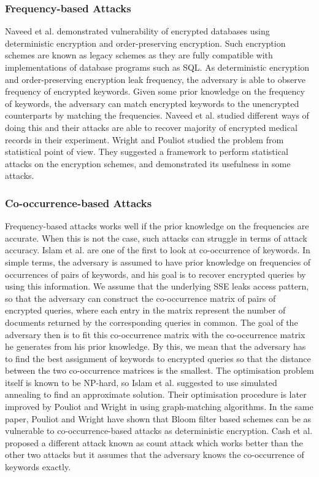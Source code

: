 \subsubsection{Frequency-based Attacks}
Naveed et al. \cite{CCS:NavKamWri15} demonstrated vulnerability of encrypted databases using deterministic encryption and order-preserving encryption. Such encryption schemes are known as legacy schemes as they are fully compatible with implementations of database programs such as SQL. As deterministic encryption and order-preserving encryption leak frequency, the adversary is able to observe frequency of encrypted keywords. Given some prior knowledge on the frequency of keywords, the adversary can match encrypted keywords to the unencrypted counterparts by matching the frequencies. Naveed et al. studied different ways of doing this and their attacks are able to recover majority of encrypted medical records in their experiment. Wright and Pouliot \cite{EPRINT:WriPou17} studied the problem from statistical point of view. They suggested a framework to perform statistical attacks on the encryption schemes, and demonstrated its usefulness in some attacks.




\subsubsection{Co-occurrence-based Attacks}
Frequency-based attacks works well if the prior knowledge on the frequencies are accurate. When this is not the case, such attacks can struggle in terms of attack accuracy. Islam et al. \cite{NDSS:IslKuzKan12} are one of the first to look at co-occurrence of keywords. In simple terms, the adversary is assumed to have prior knowledge on frequencies of occurrences of pairs of keywords, and his goal is to recover encrypted queries by using this information. We assume that the underlying SSE leaks access pattern, so that the adversary can construct the co-occurrence matrix of pairs of encrypted queries, where each entry in the matrix represent the number of documents returned by the corresponding queries in common. The goal of the adversary then is to fit this co-occurrence matrix with the co-occurrence matrix he generates from his prior knowledge. By this, we mean that the adversary has to find the best assignment of keywords to encrypted queries so that the distance between the two co-occurrence matrices is the smallest. The optimisation problem itself is known to be NP-hard, so Islam et al. suggested to use simulated annealing to find an approximate solution. Their optimisation procedure is later improved by Pouliot and Wright in \cite{CCS:PouWri16} using graph-matching algorithms. In the same paper, Pouliot and Wright have shown that Bloom filter based schemes can be as vulnerable to co-occurrence-based attacks as deterministic encryption. Cash et al. \cite{CCS:CGPR15} proposed a different attack known as count attack which works better than the other two attacks but it assumes that the adversary knows the co-occurrence of keywords exactly.




